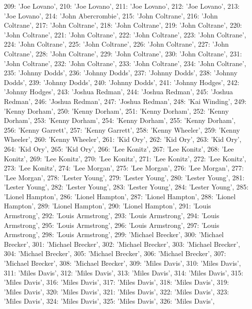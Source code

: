 \documentclass[letterpaper,10pt,english]{sphinxmanual}
\begin{document}
{\begin{sphinxVerbatim}[commandchars=\\\{\}]
 209: 'Joe Lovano',
 210: 'Joe Lovano',
 211: 'Joe Lovano',
 212: 'Joe Lovano',
 213: 'Joe Lovano',
 214: 'John Abercrombie',
 215: 'John Coltrane',
 216: 'John Coltrane',
 217: 'John Coltrane',
 218: 'John Coltrane',
 219: 'John Coltrane',
 220: 'John Coltrane',
 221: 'John Coltrane',
 222: 'John Coltrane',
 223: 'John Coltrane',
 224: 'John Coltrane',
 225: 'John Coltrane',
 226: 'John Coltrane',
 227: 'John Coltrane',
 228: 'John Coltrane',
 229: 'John Coltrane',
 230: 'John Coltrane',
 231: 'John Coltrane',
 232: 'John Coltrane',
 233: 'John Coltrane',
 234: 'John Coltrane',
 235: 'Johnny Dodds',
 236: 'Johnny Dodds',
 237: 'Johnny Dodds',
 238: 'Johnny Dodds',
 239: 'Johnny Dodds',
 240: 'Johnny Dodds',
 241: 'Johnny Hodges',
 242: 'Johnny Hodges',
 243: 'Joshua Redman',
 244: 'Joshua Redman',
 245: 'Joshua Redman',
 246: 'Joshua Redman',
 247: 'Joshua Redman',
 248: 'Kai Winding',
 249: 'Kenny Dorham',
 250: 'Kenny Dorham',
 251: 'Kenny Dorham',
 252: 'Kenny Dorham',
 253: 'Kenny Dorham',
 254: 'Kenny Dorham',
 255: 'Kenny Dorham',
 256: 'Kenny Garrett',
 257: 'Kenny Garrett',
 258: 'Kenny Wheeler',
 259: 'Kenny Wheeler',
 260: 'Kenny Wheeler',
 261: 'Kid Ory',
 262: 'Kid Ory',
 263: 'Kid Ory',
 264: 'Kid Ory',
 265: 'Kid Ory',
 266: 'Lee Konitz',
 267: 'Lee Konitz',
 268: 'Lee Konitz',
 269: 'Lee Konitz',
 270: 'Lee Konitz',
 271: 'Lee Konitz',
 272: 'Lee Konitz',
 273: 'Lee Konitz',
 274: 'Lee Morgan',
 275: 'Lee Morgan',
 276: 'Lee Morgan',
 277: 'Lee Morgan',
 278: 'Lester Young',
 279: 'Lester Young',
 280: 'Lester Young',
 281: 'Lester Young',
 282: 'Lester Young',
 283: 'Lester Young',
 284: 'Lester Young',
 285: 'Lionel Hampton',
 286: 'Lionel Hampton',
 287: 'Lionel Hampton',
 288: 'Lionel Hampton',
 289: 'Lionel Hampton',
 290: 'Lionel Hampton',
 291: 'Louis Armstrong',
 292: 'Louis Armstrong',
 293: 'Louis Armstrong',
 294: 'Louis Armstrong',
 295: 'Louis Armstrong',
 296: 'Louis Armstrong',
 297: 'Louis Armstrong',
 298: 'Louis Armstrong',
 299: 'Michael Brecker',
 300: 'Michael Brecker',
 301: 'Michael Brecker',
 302: 'Michael Brecker',
 303: 'Michael Brecker',
 304: 'Michael Brecker',
 305: 'Michael Brecker',
 306: 'Michael Brecker',
 307: 'Michael Brecker',
 308: 'Michael Brecker',
 309: 'Miles Davis',
 310: 'Miles Davis',
 311: 'Miles Davis',
 312: 'Miles Davis',
 313: 'Miles Davis',
 314: 'Miles Davis',
 315: 'Miles Davis',
 316: 'Miles Davis',
 317: 'Miles Davis',
 318: 'Miles Davis',
 319: 'Miles Davis',
 320: 'Miles Davis',
 321: 'Miles Davis',
 322: 'Miles Davis',
 323: 'Miles Davis',
 324: 'Miles Davis',
 325: 'Miles Davis',
 326: 'Miles Davis',

\end{sphinxVerbatim}}
\end{document}
